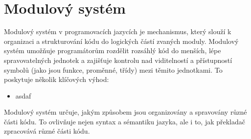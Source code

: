 
\section {Modulový systém}
Modulový systém v programovacích jazycích je mechanismus, který slouží k organizaci a strukturování kódu do logických částí zvaných moduly. Modulový systém umožňuje programátorům rozdělit rozsáhlý kód do menších, lépe spravovatelných jednotek a zajišťuje kontrolu nad viditelností a přístupností symbolů (jako jsou funkce, proměnné, třídy) mezi těmito jednotkami. To poskytuje několik klíčových výhod:

\begin{itemize}
\item asdaf
\end{itemize}


Modulový systém určuje, jakým způsobem jsou organizovány a spravovány různé části kódu. To ovlivňuje nejen syntax a sémantiku jazyka, ale i to, jak překladač zpracovává různé části kódu.

